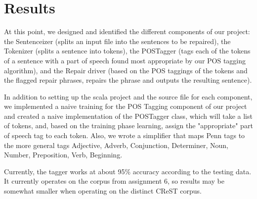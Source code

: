 \documentclass{article}
\begin{document}
\section{Results}

\begin {flushleft}

At this point, we designed and identified the different components of our project: the Sentenceizer (splits an input file into the sentences to be repaired), the Tokenizer (splits a sentence into tokens), the POSTagger (tags each of the tokens of a sentence with a part of speech found most appropriate by our POS tagging algorithm), and the Repair driver (based on the POS taggings of the tokens and the flagged repair phrases, repairs the phrase and outputs the resulting sentence).

\end {flushleft}

\begin {flushleft}

 In addition to setting up the scala project and the source file for each component, we implemented a naive training for the POS Tagging component of our project and created a naive implementation of the POSTagger class, which will take a list of tokens, and, based on the training phase learning, assign the "appropriate" part of speech tag to each token. Also, we wrote a simplifier that maps Penn tags to the more general tags {Adjective, Adverb, Conjunction, Determiner, Noun, Number, Preposition, Verb, Beginning}.

 Currently, the tagger works at about 95\% accuracy according to the testing data. It currently operates on the corpus from assignment 6, so results may be somewhat smaller when operating on the distinct CReST corpus.
 
 \end{flushleft}
\end{document}
